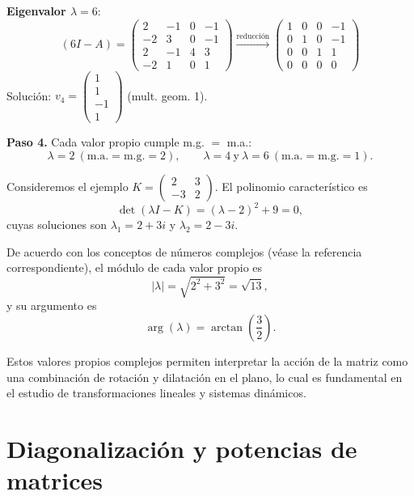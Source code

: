 \begin{example}
\begin{enumerate}[$a)$]
\begin{myproof}
\textbf{Eigenvalor $\lambda=6$}:
\[
(6I - A) = \begin{pmatrix}
2 & -1 & 0 & -1 \\
-2 & 3 & 0 & -1 \\
2 & -1 & 4 & 3 \\
-2 & 1 & 0 & 1
\end{pmatrix} \xrightarrow{\text{reducción}} \begin{pmatrix}
1 & 0 & 0 & -1 \\
0 & 1 & 0 & -1 \\
0 & 0 & 1 & 1 \\
0 & 0 & 0 & 0
\end{pmatrix}
\]
Solución: $v_4 = \begin{pmatrix} 1 \\ 1 \\ -1 \\ 1 \end{pmatrix}$ (mult. geom. 1).

\textbf{Paso 4.} Cada valor propio cumple m.g. $=$ m.a.:
\[
\boxed{\lambda=2\ (\text{m.a.}=\text{m.g.}=2), \qquad \lambda=4\ \text{y}\ \lambda=6\ (\text{m.a.}=\text{m.g.}=1).}
\]
\end{myproof}
  \end{enumerate}
\end{example}


\begin{rem}
Consideremos el ejemplo $K = \begin{pmatrix} 2 & 3 \\ -3 & 2 \end{pmatrix}$. El polinomio característico es
\[
\det(\lambda I - K) = (\lambda - 2)^2 + 9 = 0,
\]
cuyas soluciones son $\lambda_1 = 2 + 3i$ y $\lambda_2 = 2 - 3i$.

De acuerdo con los conceptos de números complejos (véase la referencia correspondiente), el módulo de cada valor propio es
\[
|\lambda| = \sqrt{2^2 + 3^2} = \sqrt{13},
\]
y su argumento es
\[
\arg(\lambda) = \arctan\left(\frac{3}{2}\right).
\]

Estos valores propios complejos permiten interpretar la acción de la matriz como una combinación de rotación y dilatación en el plano, lo cual es fundamental en el estudio de transformaciones lineales y sistemas dinámicos.
\end{rem}


\section{Diagonalización y potencias de matrices}

